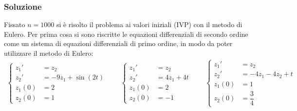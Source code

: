 \documentclass[letterpaper, 12pt]{article}
\numberwithin{equation}{section}    %
\begin{document}
\subsubsection{Soluzione}
Fissato $n = 1000$ si è risolto il problema ai valori iniziali (IVP) con il metodo di Eulero. Per prima cosa
si sono riscritte le equazioni differenziali di secondo ordine come un sistema di equazioni differenziali
di primo ordine, in modo da poter utilizzare il metodo di Eulero:
\begin{align*}
\left\{
\begin{array}{rl}
    z_1' &= z_2 \\
    z_2' &= -9z_1 + \sin(2t) \\
    z_1(0) &= 2 \\
    z_2(0) &= 1
\end{array}
\right.
\qquad
\left\{
\begin{array}{rl}
    z_1' &= z_2 \\
    z_2' &= 4z_1 + 4t \\
    z_1(0) &= 2 \\
    z_2(0) &= -1
\end{array}
\right.
\qquad
\left\{
\begin{array}{rl}
    z_1' &= z_2 \\
    z_2' &= -4z_1 - 4z_2 + t \\
    z_1(0) &= 1 \\
    z_2(0) &= \dfrac{3}{4}
\end{array}
\right.
\end{align*}
\end{document}
